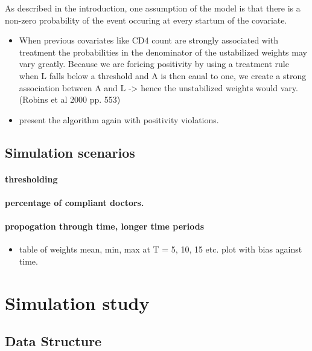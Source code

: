 \documentclass[11pt]{article}
\providecommand{\tightlist}{%
      \setlength{\itemsep}{0pt}\setlength{\parskip}{0pt}}
\begin{document}
As described in the introduction, one assumption of the model is that
there is a non-zero probability of the event occuring at every startum
of the covariate.

\begin{itemize}
\tightlist
\item
  When previous covariates like CD4 count are strongly associated with
  treatment the probabilities in the denominator of the ustabilized
  weights may vary greatly. Because we are foricing positivity by using
  a treatment rule when L falls below a threshold and A is then eaual to
  one, we create a strong association between A and L -\textgreater{}
  hence the unstabilized weights would vary. (Robins et al 2000 pp. 553)
\item
  present the algorithm again with positivity violations.
\end{itemize}

\subsection{Simulation scenarios}\label{simulation-scenarios}

\paragraph{thresholding}\label{thresholding}

\paragraph{percentage of compliant
doctors.}\label{percentage-of-compliant-doctors.}

\paragraph{propogation through time, longer time
periods}\label{propogation-through-time-longer-time-periods}

\begin{itemize}
\tightlist
\item
  table of weights mean, min, max at T = 5, 10, 15 etc. plot with bias
  against time.
\end{itemize}

    \section{Simulation study}\label{simulation-study}

\subsection{Data Structure}\label{data-structure}
\end{document}
